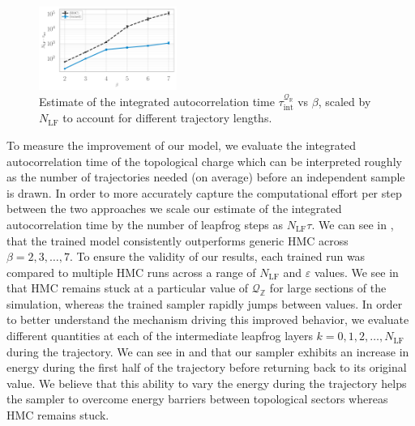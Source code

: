 \documentclass{article} %
\begin{document}
\begin{figure}
   \centering
      \centering
      \includegraphics[width=0.4\textwidth]{figures/autocorr_vs_beta_blue_2120.pdf}
      \caption{\label{fig:autocorr_vs_beta}Estimate of the integrated autocorrelation time
      \(\tau_{\mathrm{int}}^{\mathcal{Q}_{\mathbb{R}}}\) vs \(\beta\), scaled by \(N_{\mathrm{LF}}\) to account for
   different trajectory lengths.}
\end{figure}
To measure the improvement of our model, we evaluate the integrated autocorrelation time of the topological charge which can be interpreted roughly as the number of trajectories needed (on average) before an independent sample is drawn.
%
In order to more accurately capture the computational effort per step between the two approaches we scale our estimate of the integrated autocorrelation time by the number of leapfrog steps as \(N_{\mathrm{LF}}\tau\).
We can see in , that the trained model consistently outperforms generic HMC across \(\beta = 2, 3, \ldots, 7\).
%
To ensure the validity of our results, each trained run was compared to multiple HMC runs across a range of \(N_{\mathrm{LF}}\) and \(\varepsilon\) values.
%
We see in  that HMC remains stuck at a particular value of \(\mathcal{Q}_{\mathbb{Z}}\) for large sections of the simulation, whereas the trained sampler rapidly jumps between values.
%
In order to better understand the mechanism driving this improved behavior, we evaluate different quantities at each of the intermediate leapfrog layers \(k=0, 1, 2, \ldots, N_{\mathrm{LF}}\) during the trajectory.
%
We can see in  and  that our sampler exhibits an increase in energy during the first half of the trajectory before returning back to its original value.
%
We believe that this ability to vary the energy during the trajectory helps the sampler to overcome energy barriers between topological sectors whereas HMC remains stuck.
%
%
\end{document}
